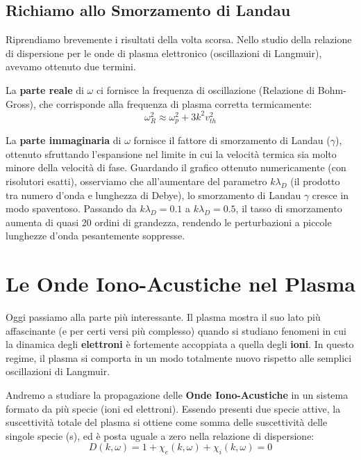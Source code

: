 \subsection{Richiamo allo Smorzamento di Landau}
Riprendiamo brevemente i risultati della volta scorsa. Nello studio della relazione di dispersione per le onde di plasma elettronico (oscillazioni di Langmuir), avevamo ottenuto due termini.

La \textbf{parte reale} di $\omega$ ci fornisce la frequenza di oscillazione (Relazione di Bohm-Gross), che corrisponde alla frequenza di plasma corretta termicamente:
\begin{equation}
\omega_R^2 \approx \omega_p^2 + 3 k^2 v_{th}^2
\end{equation}

La \textbf{parte immaginaria} di $\omega$ fornisce il fattore di smorzamento di Landau ($\gamma$), ottenuto sfruttando l'espansione nel limite in cui la velocità termica sia molto minore della velocità di fase.
Guardando il grafico ottenuto numericamente (con risolutori esatti), osserviamo che all'aumentare del parametro $k\lambda_D$ (il prodotto tra numero d'onda e lunghezza di Debye), lo smorzamento di Landau $\gamma$ cresce in modo spaventoso. Passando da $k\lambda_D = 0.1$ a $k\lambda_D = 0.5$, il tasso di smorzamento aumenta di quasi 20 ordini di grandezza, rendendo le perturbazioni a piccole lunghezze d'onda pesantemente soppresse.

\section{Le Onde Iono-Acustiche nel Plasma}

Oggi passiamo alla parte più interessante. Il plasma mostra il suo lato più affascinante (e per certi versi più complesso) quando si studiano fenomeni in cui la dinamica degli \textbf{elettroni} è fortemente accoppiata a quella degli \textbf{ioni}. In questo regime, il plasma si comporta in un modo totalmente nuovo rispetto alle semplici oscillazioni di Langmuir.

Andremo a studiare la propagazione delle \textbf{Onde Iono-Acustiche} in un sistema formato da più specie (ioni ed elettroni).
Essendo presenti due specie attive, la suscettività totale del plasma si ottiene come somma delle suscettività delle singole specie (s), ed è posta uguale a zero nella relazione di dispersione:
\begin{equation}
D(k, \omega) = 1 + \chi_e(k,\omega) + \chi_i(k,\omega) = 0
\end{equation}

